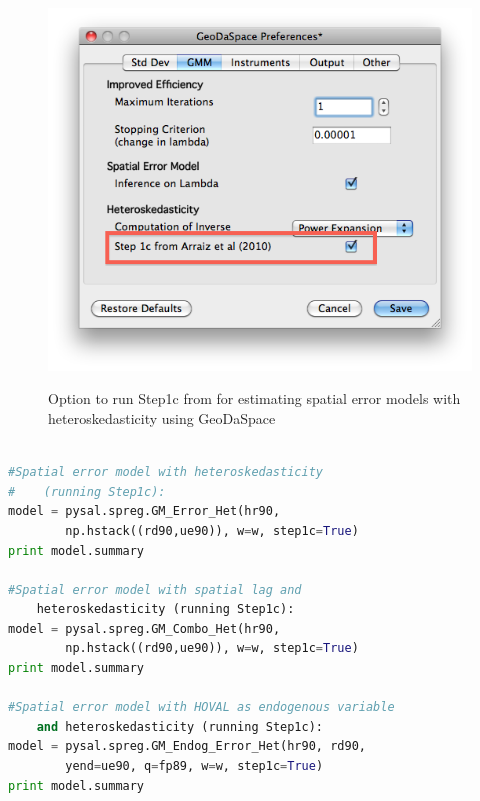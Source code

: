\documentclass{article}
\begin{document}
\begin{figure}[htb]
\caption{Option to run Step1c from \citet{Arraiz10} for estimating spatial error models with heteroskedasticity using GeoDaSpace}
\label{f:GS_pref_step1c}
\begin{center}
\includegraphics[width=0.7\linewidth]{GS_pref_step1c.png}\\
\end{center}
\end{figure}

\begin{code}
\begin{lstlisting}[label=lt:het_endog_stata,caption=Using PySAL to match the results of spatial error models with heteroskedasticity and endogenous variables or spatial lag from Stata,language=Python]

#Spatial error model with heteroskedasticity
#    (running Step1c):
model = pysal.spreg.GM_Error_Het(hr90,
        np.hstack((rd90,ue90)), w=w, step1c=True)
print model.summary

#Spatial error model with spatial lag and
    heteroskedasticity (running Step1c):
model = pysal.spreg.GM_Combo_Het(hr90,
        np.hstack((rd90,ue90)), w=w, step1c=True)
print model.summary

#Spatial error model with HOVAL as endogenous variable
    and heteroskedasticity (running Step1c):
model = pysal.spreg.GM_Endog_Error_Het(hr90, rd90,
        yend=ue90, q=fp89, w=w, step1c=True)
print model.summary

\end{lstlisting}
\end{code}


\newpage


\end{document}
